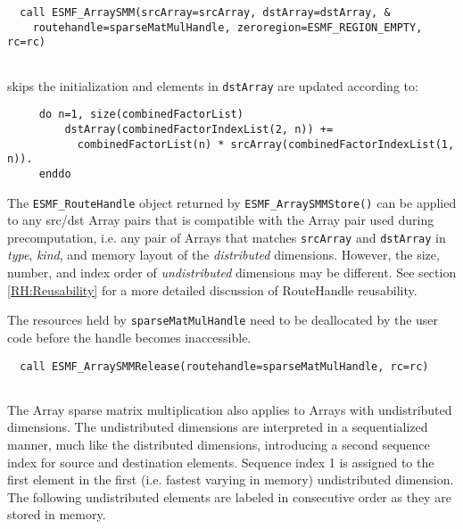  \begin{verbatim}
  call ESMF_ArraySMM(srcArray=srcArray, dstArray=dstArray, &
    routehandle=sparseMatMulHandle, zeroregion=ESMF_REGION_EMPTY, rc=rc)
 
\end{verbatim}
 

   skips the initialization and elements in {\tt dstArray} are updated according to:
  
   \begin{verbatim}
     do n=1, size(combinedFactorList)
         dstArray(combinedFactorIndexList(2, n)) += 
           combinedFactorList(n) * srcArray(combinedFactorIndexList(1, n)).
     enddo
   \end{verbatim}
  
   The {\tt ESMF\_RouteHandle} object returned by {\tt ESMF\_ArraySMMStore()}
   can be applied to any src/dst Array pairs that is compatible with the
   Array pair used during precomputation, i.e. any pair of Arrays that matches 
   {\tt srcArray} and {\tt dstArray} in {\em type}, {\em kind}, and 
   memory layout of the {\em distributed} dimensions. However, the size, number, 
   and index order of {\em undistributed} dimensions may be different.
   See section \ref{RH:Reusability} for a more detailed discussion of
   RouteHandle reusability.
  
   The resources held by {\tt sparseMatMulHandle} need to be deallocated by the
   user code before the handle becomes inaccessible. 

 \begin{verbatim}
  call ESMF_ArraySMMRelease(routehandle=sparseMatMulHandle, rc=rc)
 
\end{verbatim}
 

   The Array sparse matrix multiplication also applies to Arrays with
   undistributed dimensions. The undistributed dimensions are interpreted
   in a sequentialized manner, much like the distributed dimensions,
   introducing a second sequence index for source and destination elements.
   Sequence index 1 is assigned to the first element in the first 
   (i.e. fastest varying in memory) undistributed dimension. The following
   undistributed elements are labeled in consecutive order as they are stored in
   memory.
  
